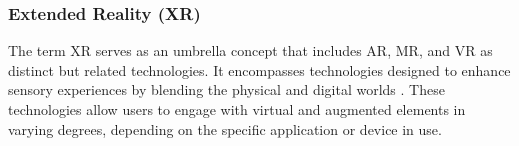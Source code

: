 \subsubsection{Extended Reality (\ac{XR})}
    The term \ac{XR} serves as an umbrella concept that includes \ac{AR}, \ac{MR}, and \ac{VR} as distinct but related technologies. It encompasses technologies designed to enhance sensory experiences by blending the physical and digital worlds \cite{pesca2021augmented}. These technologies allow users to engage with virtual and augmented elements in varying degrees, depending on the specific application or device in use.





    


